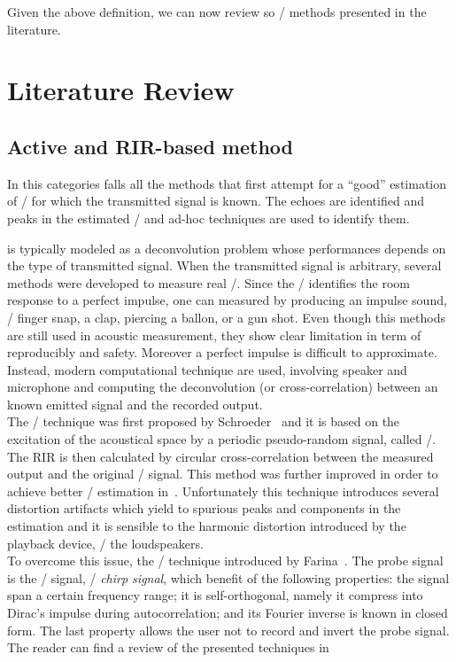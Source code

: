 Given the above definition, we can now review so \AER/ methods presented in the literature.

\section{Literature Review}\label{sec:estimation:sota}

\subsection{Active and RIR-based method}
In this categories falls all the methods that first attempt for a ``good'' estimation of \RIRs/ for which the transmitted signal is known.
The echoes are identified and peaks in the estimated \RIRs/ and ad-hoc techniques are used to identify them.

 is typically modeled as a deconvolution problem whose performances depends on the type of transmitted signal.
When the transmitted signal is arbitrary, several methods were developed to measure real \RIRs/.
Since the \RIR/ identifies the room response to a perfect impulse, one can measured by producing an impulse sound, \eg/ finger snap, a clap, piercing a ballon, or a gun shot.
Even though this methods are still used in acoustic measurement, they show clear limitation in term of reproducibly and safety.
Moreover a perfect impulse is difficult to approximate.
Instead, modern computational technique are used, involving speaker and microphone and computing the deconvolution (or cross-correlation) between an known emitted signal and the recorded output.
\\The \MLSdef/ technique was first proposed by Schroeder~ and it is based on the excitation of the acoustical space by a periodic pseudo-random signal, called \MLS/.
The RIR is then calculated by circular cross-correlation between the measured output and the original \MLS/ signal.
This method was further improved in order to achieve better \RIR/ estimation in~.
Unfortunately this technique introduces several distortion artifacts which yield to spurious peaks and components in the estimation and it is sensible to the harmonic distortion introduced by the playback device, \eg/ the loudspeakers.
\\To overcome this issue, the \ESSdef/ technique introduced by Farina~.
The probe signal is the \ESS/ signal, \aka/ \textit{chirp signal}, which benefit of the following properties:
the signal span a certain frequency range; it is self-orthogonal, namely it compress into Dirac's impulse during autocorrelation; and its Fourier inverse is known in closed form.
The last property allows the user not to record and invert the probe signal.
The reader can find a review of the presented techniques in~

